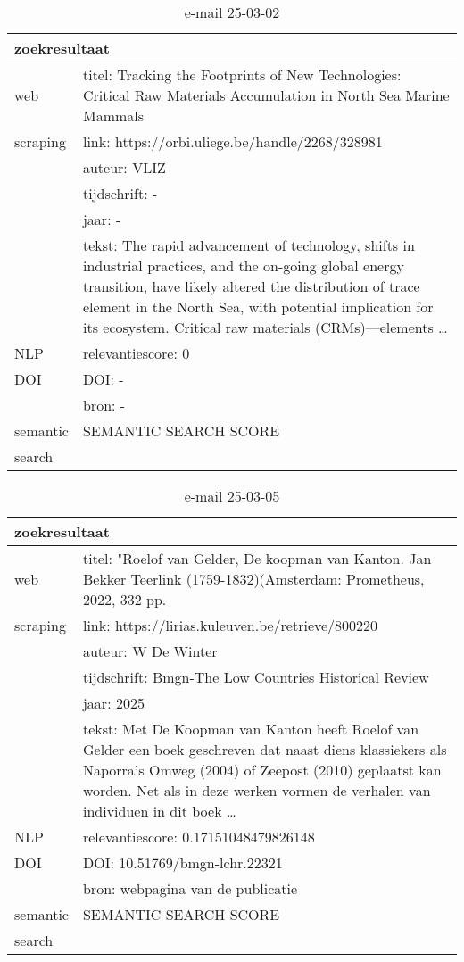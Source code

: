 \begin{table}[h!]
    \caption{e-mail 25-03-02}
    \centering
    \begin{tabularx}{\textwidth}{|p{4cm}|X|} 
        \hline
        \multicolumn{2}{|X|}{\textbf{zoekresultaat}} \\
        \hline
        web &titel: Tracking the Footprints of New Technologies: Critical Raw Materials Accumulation in North Sea Marine Mammals\\
        scraping&link: https://orbi.uliege.be/handle/2268/328981\\
        &auteur: VLIZ\\
        &tijdschrift: -\\
        &jaar: -\\
        &tekst: The rapid advancement of technology, shifts in industrial practices, and the on-going global energy transition, have likely altered the distribution of trace element in the North Sea, with potential implication for its ecosystem. Critical raw materials (CRMs)—elements …\\
        \hline
        NLP&relevantiescore: 0\\
        \hline
        DOI&DOI: -\\
        &bron: -\\
        \hline
        semantic&SEMANTIC SEARCH SCORE\\
        search&\\
        \hline
    \end{tabularx}
    \label{table:email20250302}
\end{table}
\begin{table}[h!]
    \caption{e-mail 25-03-05}
    \centering
    \begin{tabularx}{\textwidth}{|p{4cm}|X|} 
        \hline
        \multicolumn{2}{|X|}{\textbf{zoekresultaat}} \\
        \hline
        web &titel:  "Roelof van Gelder, De koopman van Kanton. Jan Bekker Teerlink (1759-1832)(Amsterdam: Prometheus, 2022, 332 pp.\\
        scraping&link: https://lirias.kuleuven.be/retrieve/800220\\
        &auteur: W De Winter\\
        &tijdschrift: Bmgn-The Low Countries Historical Review\\
        &jaar: 2025\\
        &tekst: Met De Koopman van Kanton heeft Roelof van Gelder een boek geschreven dat naast diens klassiekers als Naporra’s Omweg (2004) of Zeepost (2010) geplaatst kan worden. Net als in deze werken vormen de verhalen van individuen in dit boek …\\
        \hline
        NLP&relevantiescore: 0.17151048479826148\\
        \hline
        DOI&DOI: 10.51769/bmgn-lchr.22321\\
        &bron: webpagina van de publicatie\\
        \hline
        semantic&SEMANTIC SEARCH SCORE\\
        search&\\
        \hline
    \end{tabularx}
    \label{table:email20250305}
\end{table}
